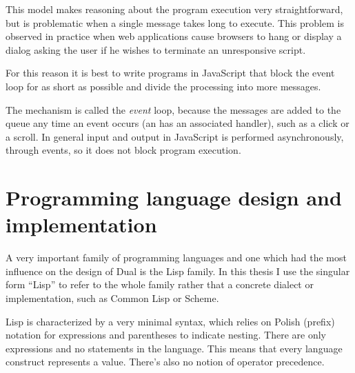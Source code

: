 This model makes reasoning about the program execution very straightforward, but
is problematic when a single message takes long to execute. This problem is
observed in practice when web applications cause browsers to hang or display a
dialog asking the user if he wishes to terminate an unresponsive script.

For this reason it is best to write programs in JavaScript that block the event
loop for as short as possible and divide the processing into more messages.

The mechanism is called the \textit{event} loop, because the messages are added
to the queue any time an event occurs (an has an associated handler), such as a
click or a scroll. In general input and output in JavaScript is performed
asynchronously, through events, so it does not block program execution.


\section{Programming language design and implementation}
A very important family of programming languages and one which had the most
influence on the design of Dual is the Lisp family. In this thesis I use the
singular form ``Lisp'' to refer to the whole family rather that a concrete
dialect or implementation, such as Common Lisp or Scheme.

Lisp is characterized by a very minimal syntax, which relies on Polish (prefix)
notation for expressions and parentheses to indicate nesting. There are only
expressions and no statements in the language. This means that every language
construct represents a value. There's also no notion of operator precedence.

